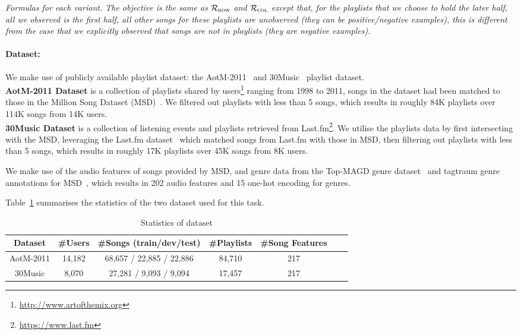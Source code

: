 \TODO
{\it Formulas for each variant.
The objective is the same as $\mathcal{R}_\textsc{row}$ and $\mathcal{R}_\textsc{col}$ except that,
for the playlists that we choose to hold the later half, all we observed is the first half, 
all other songs for these playlists are unobserved (they can be positive/negative examples),
this is different from the case that we explicitly observed that songs are not in playlists (they are negative examples).
}




\paragraph{Dataset:}
We make use of publicly available playlist dataset: the AotM-2011~\cite{mcfee2012hypergraph} and 30Music~\cite{30music2015} playlist dataset. \\
%
{\bf AotM-2011 Dataset} is a collection of playlists shared by users\footnote{\url{http://www.artofthemix.org}} ranging from 1998 to 2011, 
songs in the dataset had been matched to those in the Million Song Dataset (MSD)~\cite{msd2011}.
We filtered out playlists with less than 5 songs, which results in roughly 84K playlists over 114K songs from 14K users. \\
%
{\bf 30Music Dataset} is a collection of listening events and playlists retrieved from Last.fm\footnote{\url{https://www.last.fm}}.
We utilise the playlists data by first intersecting with the MSD, leveraging the Last.fm dataset~\cite{lastfmdataset} 
which matched songs from Last.fm with those in MSD, then filtering out playlists with less than 5 songs, 
which results in roughly 17K playlists over 45K songs from 8K users.

We make use of the audio features of songs provided by MSD, 
and genre data from the Top-MAGD genre dataset~\cite{schindler2012facilitating} and tagtraum genre annotations for MSD~\cite{schreiber2015improving},
which results in 202 audio features and 15 one-hot encoding for genres.


Table~\ref{tab:stats_newsongrec} summarises the statistics of the two dataset used for this task.

\begin{table}[!h]
\centering
\caption{Statistics of dataset}
\label{tab:stats_newsongrec}
\begin{tabular}{ccccccc}
\toprule
Dataset & \#Users & \#Songs (train/dev/test) & \#Playlists & \#Song Features \\
\midrule
AotM-2011 & 14,182  & 68,657 / 22,885 / 22,886 & 84,710 & 217 \\
30Music   & 8,070   & 27,281 / 9,093 / 9,094   & 17,457 & 217 \\
\bottomrule
\end{tabular}
\end{table}


